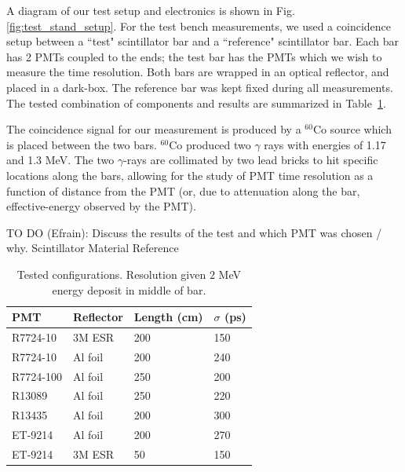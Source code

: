 \documentclass[3p,final,twocolumn]{elsarticle}
\begin{document}
A diagram of our test setup and electronics is shown in Fig. \ref{fig:test_stand_setup}. For the test bench measurements, we used a coincidence setup between a ``test" scintillator bar and a ``reference" scintillator bar. Each bar has 2 PMTs 
coupled to the ends; the test bar has the PMTs which we wish to measure the time resolution. Both bars are wrapped in an optical reflector, and placed in a dark-box. The reference bar was kept fixed during all measurements. The tested combination of components and results are summarized in Table~\ref{tab:tests}. 

The coincidence signal for our measurement is produced by a $^{60}$Co source which is placed between the two bars. $^{60}$Co produced  
two $\gamma$ rays with energies of 1.17  and  1.3 \si{\mega\electronvolt}. The two $\gamma$-rays are collimated by two lead bricks to hit specific locations along the bars, allowing for the 
study of PMT time resolution as a function of distance from the PMT (or, due to attenuation along the bar, effective-energy observed by the PMT).

{\color{red}TO DO (Efrain): Discuss the results of the test and which PMT was chosen / why.}
Scintillator Material Reference \cite{scint-mat-ref}


\begin{table}[t!]
	\caption{Tested configurations. Resolution given $2$ \si{\mega\electronvolt} energy deposit in middle of bar.}
\centering
	\begin{tabular}{ m{5em} | m{4em} | m{3em} |  m{3em} }
		\hline
			PMT & Reflector & Length (cm) & $\sigma$ (\si{\pico\second})\\
		\hline\hline	
			R7724-10 & 3M ESR &   200 & 150	\\
			R7724-10 & Al foil &  200 &  240		\\
			R7724-100 & Al foil &  250 & 200 		\\
			R13089 & Al foil &  250 & 220			\\			
			R13435 & Al foil &  200 & 300 			\\	
		
			ET-9214 & Al foil &   200 & 270			\\
			ET-9214 &   3M ESR & 50 & 150				\\
		\hline
	\end{tabular}
	\label{tab:tests}

\end{table}
\end{document}
